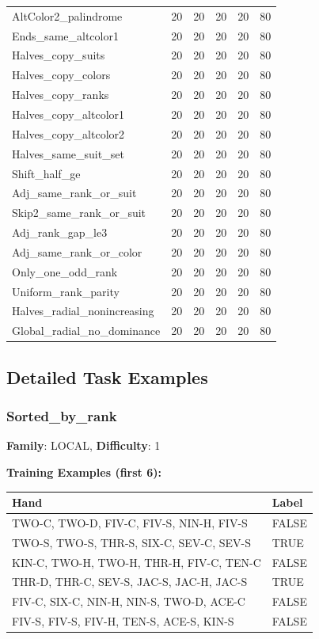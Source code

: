 \documentclass[10pt,a4paper]{article}
\begin{document}
\begin{tabular}{lrrrrr}
AltColor2\_palindrome & 20 & 20 & 20 & 20 & 80 \\
Ends\_same\_altcolor1 & 20 & 20 & 20 & 20 & 80 \\
Halves\_copy\_suits & 20 & 20 & 20 & 20 & 80 \\
Halves\_copy\_colors & 20 & 20 & 20 & 20 & 80 \\
Halves\_copy\_ranks & 20 & 20 & 20 & 20 & 80 \\
Halves\_copy\_altcolor1 & 20 & 20 & 20 & 20 & 80 \\
Halves\_copy\_altcolor2 & 20 & 20 & 20 & 20 & 80 \\
Halves\_same\_suit\_set & 20 & 20 & 20 & 20 & 80 \\
Shift\_half\_ge & 20 & 20 & 20 & 20 & 80 \\
Adj\_same\_rank\_or\_suit & 20 & 20 & 20 & 20 & 80 \\
Skip2\_same\_rank\_or\_suit & 20 & 20 & 20 & 20 & 80 \\
Adj\_rank\_gap\_le3 & 20 & 20 & 20 & 20 & 80 \\
Adj\_same\_rank\_or\_color & 20 & 20 & 20 & 20 & 80 \\
Only\_one\_odd\_rank & 20 & 20 & 20 & 20 & 80 \\
Uniform\_rank\_parity & 20 & 20 & 20 & 20 & 80 \\
Halves\_radial\_nonincreasing & 20 & 20 & 20 & 20 & 80 \\
Global\_radial\_no\_dominance & 20 & 20 & 20 & 20 & 80 \\
\bottomrule
\end{tabular}

\subsection{Detailed Task Examples}

\subsubsection{Sorted\_by\_rank}

\textbf{Family}: LOCAL, \textbf{Difficulty}: 1

\textbf{Training Examples (first 6):}

\begin{small}
\begin{tabular}{p{8cm}l}
\toprule
Hand & Label \\
\midrule
TWO-C, TWO-D, FIV-C, FIV-S, NIN-H, FIV-S & \textcolor{negative}{FALSE} \\
TWO-S, TWO-S, THR-S, SIX-C, SEV-C, SEV-S & \textcolor{positive}{TRUE} \\
KIN-C, TWO-H, TWO-H, THR-H, FIV-C, TEN-C & \textcolor{negative}{FALSE} \\
THR-D, THR-C, SEV-S, JAC-S, JAC-H, JAC-S & \textcolor{positive}{TRUE} \\
FIV-C, SIX-C, NIN-H, NIN-S, TWO-D, ACE-C & \textcolor{negative}{FALSE} \\
FIV-S, FIV-S, FIV-H, TEN-S, ACE-S, KIN-S & \textcolor{negative}{FALSE} \\
\bottomrule
\end{tabular}
\end{small}
\end{document}
